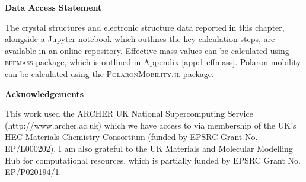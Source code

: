\textbf{Data Access Statement}

The crystal structures and electronic structure data reported in this chapter, alongside a Jupyter notebook which outlines the key calculation steps, are available 
in an online repository.\autocite{Whalley2018b}
Effective mass values can be calculated using \textsc{effmass} package,\autocite{Whalley2018a} which is outlined in Appendix \ref{app:1-effmass}.
Polaron mobility can be calculated using the \textsc{PolaronMobility.jl} package.\autocite{Frost2018} 

\textbf{Acknowledgements}

This work used the ARCHER UK National Supercomputing Service \\ (http://www.archer.ac.uk) which we have access to via membership of the UK's HEC Materials Chemistry Consortium (funded by EPSRC Grant No. EP/L000202). I am also grateful to the UK Materials and Molecular Modelling Hub for computational resources, which is partially funded by EPSRC Grant No. EP/P020194/1.